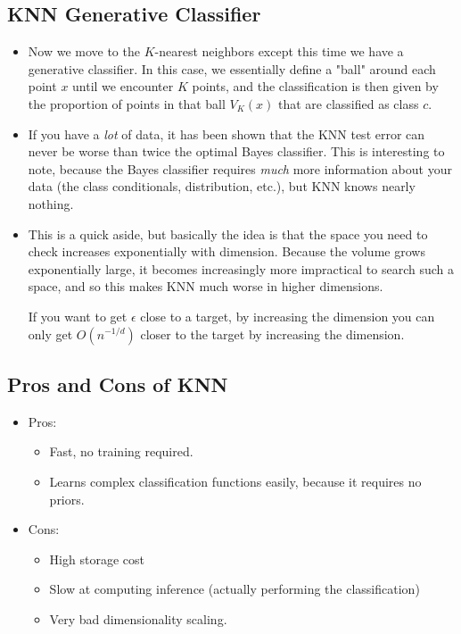 \subsection{KNN Generative Classifier}
\begin{itemize}
	\item Now we move to the \( K \)-nearest neighbors except this time we have a generative classifier. In
		this case, we essentially define a "ball" around each point \( x \) until we encounter \( K \)
		points, and the classification is then given by the proportion of points in that ball \( V_K(x) \)
		that are classified as class \( c \).      
	\item If you have a \textit{lot} of data, it has been shown that the KNN test error can never be worse
		than twice the optimal Bayes classifier. This is interesting to note, because the Bayes classifier
		requires \textit{much} more information about your data (the class conditionals, distribution, etc.),
		but KNN knows nearly nothing.  
	\item This is a quick aside, but basically the idea is that the space you need to check increases
		exponentially with dimension. Because the volume grows exponentially large, it becomes increasingly
		more impractical to search such a space, and so this makes KNN much worse in higher dimensions.  

		If you want to get \( \epsilon \) close to a target, by increasing the dimension you can only get 
		\( O(n^{ - 1 / d}) \) closer to the target by increasing the dimension. 
\end{itemize}

\subsection{Pros and Cons of KNN}
\begin{itemize}
	\item Pros:
		\begin{itemize}
			\item Fast, no training required.
			\item Learns complex classification functions easily, because it requires no priors.
		\end{itemize}
	\item Cons:
		\begin{itemize}
			\item High storage cost
			\item Slow at computing inference (actually performing the classification)  
			\item Very bad dimensionality scaling. 
		\end{itemize}
\end{itemize}

